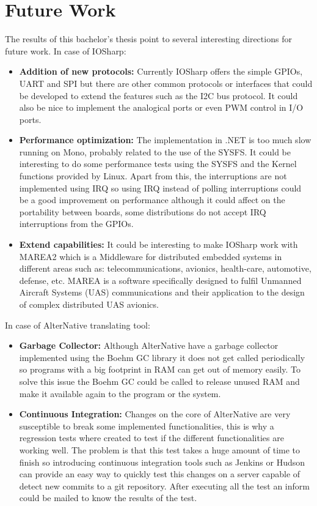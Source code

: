 \section{Future Work}\label{S:Future-Work}
The results of this bachelor's thesis point to several interesting directions for future work.
In case of IOSharp:
\begin{itemize}
\item \textbf{Addition of new protocols:} Currently IOSharp offers the simple GPIOs, UART and SPI but there are other common protocols or interfaces that could be developed to extend the features such as the \gls{I2C} bus protocol. It could also be nice to implement the analogical ports or even \gls{PWM} control in I/O ports.

\item \textbf{Performance optimization:} The implementation in .NET is too much slow running on Mono, probably related to the use of the \gls{SYSFS}. It could be interesting to do some performance tests using the \gls{SYSFS} and the Kernel functions provided by Linux. Apart from this, the interruptions are not implemented using \gls{IRQ} so using \gls{IRQ} instead of polling interruptions could be a good improvement on performance although it could affect on the portability between boards, some distributions do not accept IRQ interruptions from the GPIOs.

\item \textbf{Extend capabilities:} It could be interesting to make IOSharp work with MAREA2 which is a Middleware for distributed embedded systems in different areas such as: telecommunications, avionics, health-care, automotive, defense, etc. MAREA is a software specifically designed to fulfil Unmanned Aircraft Systems (UAS) communications and their application to the design of complex distributed UAS avionics.
\end{itemize}

In case of AlterNative translating tool:
\begin{itemize}
\item \textbf{Garbage Collector:} Although AlterNative have a garbage collector implemented using the Boehm GC library it does not get called periodically so programs with a big footprint in RAM can get out of memory easily. To solve this issue the Boehm GC could be called to release unused RAM and make it available again to the program or the system.

\item \textbf{Continuous Integration:} Changes on the core of AlterNative are very susceptible to break some implemented functionalities, this is why a regression tests where created to test if the different functionalities are working well. The problem is that this test takes a huge amount of time to finish so introducing continuous integration tools such as Jenkins or Hudson can provide an easy way to quickly test this changes on a server capable of detect new commits to a git repository. After executing all the test an inform could be mailed to know the results of the test.
\end{itemize}

